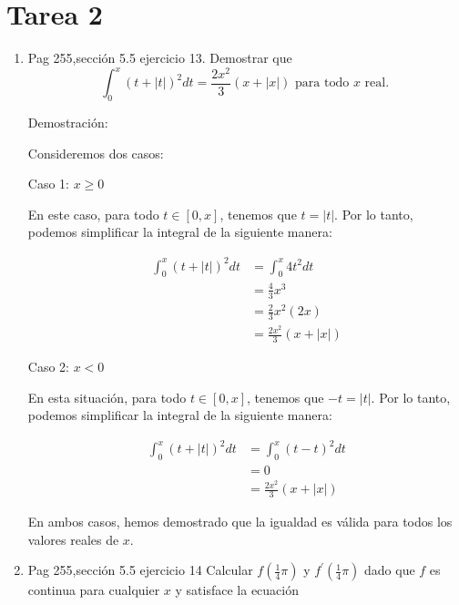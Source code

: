 \documentclass{report}
\begin{document}
    \chapter{ Tarea 2 }

    \begin{enumerate}\item Pag 255,sección 5.5 ejercicio 13. Demostrar que
        \[
        \int_{0}^{x}(t+|t|)^{2} dt=\frac{2 x^{2}}{3}(x+|x|) \text { para todo } x \text { real. }
        \]
        
        Demostración:
        
        Consideremos dos casos:
        
        Caso 1: \(x \geq 0\)
        
        En este caso, para todo \(t \in [0,x]\), tenemos que \(t = |t|\). Por lo tanto, podemos simplificar la integral de la siguiente manera:
        
        \begin{align*}
        \int_{0}^{x}(t+|t|)^{2} dt &= \int_{0}^{x} 4t^{2} dt \\
        &= \frac{4}{3}x^{3} \\
        &= \frac{2}{3}x^{2}(2x) \\
        &= \frac{2x^{2}}{3}(x+|x|)
        \end{align*}
        
        Caso 2: \(x < 0\)
        
        En esta situación, para todo \(t \in [0,x]\), tenemos que \(-t = |t|\). Por lo tanto, podemos simplificar la integral de la siguiente manera:
        
        \begin{align*}
        \int_{0}^{x}(t+|t|)^{2} dt &= \int_{0}^{x}(t-t)^{2} dt \\
        &= 0 \\
        &= \frac{2x^{2}}{3}(x+|x|)
        \end{align*}
        
        En ambos casos, hemos demostrado que la igualdad es válida para todos los valores reales de \(x\).
        
        \item Pag 255,sección 5.5 ejercicio 14 Calcular $f\left(\frac{1}{4} \pi\right)$ y $f^{\prime}\left(\frac{1}{4} \pi\right)$ dado que $f$ es continua para cualquier $x$ y satisface la ecuación
        

\end{enumerate}
\end{document}
